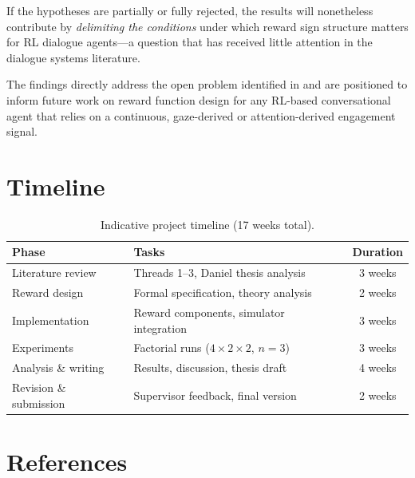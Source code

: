 \documentclass[12pt,a4paper]{article}
\begin{document}
If the hypotheses are partially or fully rejected, the results will nonetheless contribute by \emph{delimiting the conditions} under which reward sign structure matters for RL dialogue agents---a question that has received little attention in the dialogue systems literature.

The findings directly address the open problem identified in \citet{bourdon2025} and are positioned to inform future work on reward function design for any RL-based conversational agent that relies on a continuous, gaze-derived or attention-derived engagement signal.

\section{Timeline}
\label{sec:timeline}

\begin{table}[h]
\centering
\caption{Indicative project timeline (17 weeks total).}
\label{tab:timeline}
\begin{tabular}{@{} l l c @{}}
\toprule
\textbf{Phase} & \textbf{Tasks} & \textbf{Duration} \\
\midrule
Literature review & Threads 1--3, Daniel thesis analysis & 3 weeks \\
Reward design & Formal specification, theory analysis & 2 weeks \\
Implementation & Reward components, simulator integration & 3 weeks \\
Experiments & Factorial runs ($4 \times 2 \times 2$, $n = 3$) & 3 weeks \\
Analysis \& writing & Results, discussion, thesis draft & 4 weeks \\
Revision \& submission & Supervisor feedback, final version & 2 weeks \\
\bottomrule
\end{tabular}
\end{table}

\section*{References}
\end{document}
